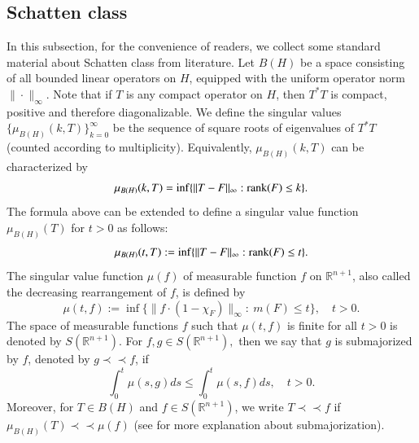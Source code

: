 \documentclass[12pt]{amsart}
\begin{document}
\subsection{Schatten class}\label{Spdef}
In this subsection, for the convenience of readers, we collect some standard material about Schatten class from literature. Let $B(H)$ be a space consisting of all bounded linear operators on $H$, equipped with the uniform operator norm $\|\cdot\|_\infty$.  Note that if $T$ is any compact operator on $H$, then $T^{*}T$ is compact, positive and therefore diagonalizable. We define the singular values $\{\mu_{B(H)}(k,T)\}_{k=0}^{\infty}$ be the sequence of square roots of eigenvalues of $T^{*}T$ (counted according to multiplicity). Equivalently, $\mu_{B(H)}(k,T)$ can be characterized by
\begin{align*}
\mu_{B(H)}(k,T)=\inf\{\|T-F\|_\infty:{\rm rank}(F)\leq k\}.
\end{align*}
The formula above can be extended to define a singular value function $\mu_{B(H)}(T)$ for $t>0$ as follows:
\begin{align*}
\mu_{B(H)}(t,T):=\inf\{\|T-F\|_\infty:{\rm rank}(F)\leq t\}.
\end{align*}
The singular value function $\mu(f)$ of measurable function $f$ on $\mathbb{R}^{n+1}$, also called the decreasing rearrangement of $f$, is defined by
$$\mu(t,f):=\inf\{\|f\cdot (1-\chi_F)\|_\infty:\ m(F)\leq t\},\quad t>0.$$
The space of measurable functions $f$ such that $\mu(t,f)$ is finite for all $t>0$ is denoted by $S(\mathbb{R}^{n+1})$. For $f,g\in S(\mathbb{R}^{n+1}),$ then we say that $g$ is submajorized by $f$, denoted by $g\prec\prec f$, if
$$\int_0^t \mu(s,g)ds\leq \int_0^t \mu(s,f)ds,\quad t>0.$$
Moreover, for $T\in B(H)$ and $f\in S(\mathbb{R}^{n+1})$, we write $T\prec\prec f$ if $\mu_{B(H)}(T)\prec\prec \mu(f)$ (see \cite[Section 1]{LSZ2} for more explanation about submajorization).
\end{document}
